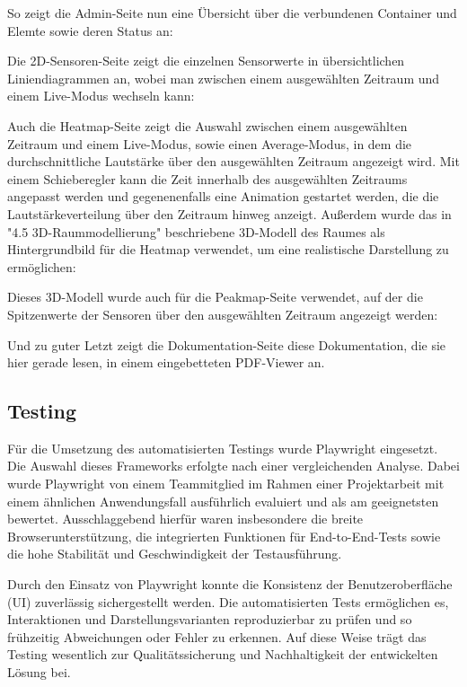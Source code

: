 So zeigt die Admin-Seite nun eine Übersicht über die verbundenen Container und Elemte sowie deren Status an:
\begin{center}
\end{center}

Die 2D-Sensoren-Seite zeigt die einzelnen Sensorwerte in übersichtlichen Liniendiagrammen an, wobei man zwischen einem ausgewählten Zeitraum und einem Live-Modus wechseln kann:
\begin{center}
\end{center}

Auch die Heatmap-Seite zeigt die Auswahl zwischen einem ausgewählten Zeitraum und einem Live-Modus, sowie einen Average-Modus, in dem die durchschnittliche Lautstärke über den ausgewählten Zeitraum angezeigt wird. 
Mit einem Schieberegler kann die Zeit innerhalb des ausgewählten Zeitraums angepasst werden und gegenenenfalls eine Animation gestartet werden, die die Lautstärkeverteilung über den Zeitraum hinweg anzeigt.
Außerdem wurde das in "4.5 3D-Raummodellierung" beschriebene 3D-Modell des Raumes als Hintergrundbild für die Heatmap verwendet, um eine realistische Darstellung zu ermöglichen:
\begin{center}
\end{center}

Dieses 3D-Modell wurde auch für die Peakmap-Seite verwendet, auf der die Spitzenwerte der Sensoren über den ausgewählten Zeitraum angezeigt werden:
\begin{center}
\end{center}

Und zu guter Letzt zeigt die Dokumentation-Seite diese Dokumentation, die sie hier gerade lesen, in einem eingebetteten PDF-Viewer an. 

\subsection{Testing}
Für die Umsetzung des automatisierten Testings wurde Playwright eingesetzt. Die Auswahl dieses Frameworks erfolgte nach einer vergleichenden Analyse. Dabei wurde Playwright von einem Teammitglied im Rahmen einer Projektarbeit mit einem ähnlichen Anwendungsfall ausführlich evaluiert und als am geeignetsten bewertet. Ausschlaggebend hierfür waren insbesondere die breite Browserunterstützung, die integrierten Funktionen für End-to-End-Tests sowie die hohe Stabilität und Geschwindigkeit der Testausführung.

Durch den Einsatz von Playwright konnte die Konsistenz der Benutzeroberfläche (UI) zuverlässig sichergestellt werden. Die automatisierten Tests ermöglichen es, Interaktionen und Darstellungsvarianten reproduzierbar zu prüfen und so frühzeitig Abweichungen oder Fehler zu erkennen. Auf diese Weise trägt das Testing wesentlich zur Qualitätssicherung und Nachhaltigkeit der entwickelten Lösung bei.



